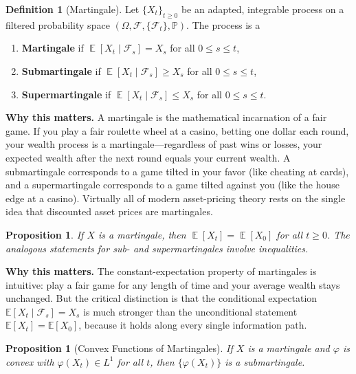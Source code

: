 \documentclass[11pt,a4paper,openany]{book}
\theoremstyle{definition}
\newtheorem{definition}{Definition}[chapter]
\theoremstyle{plain}
\newtheorem{proposition}[theorem]{Proposition}
\theoremstyle{remark}
\DeclareMathOperator{\E}{\mathbb{E}}
\newcommand{\1}{\mathbbm{1}}
\newcommand{\F}{\mathcal{F}}
\newcommand{\Pbb}{\mathbb{P}}
\begin{document}
\begin{definition}[Martingale]
Let $\{X_{t}\}_{t \geq 0}$ be an adapted, integrable process on a filtered probability space $(\Omega, \F, \{\F_{t}\}, \Pbb)$. The process is a
\begin{enumerate}[label=(\arabic*)]
    \item \textbf{Martingale} if $\E[X_{t} \mid \F_{s}] = X_{s}$ for all $0 \leq s \leq t$,
    \item \textbf{Submartingale} if $\E[X_{t} \mid \F_{s}] \geq X_{s}$ for all $0 \leq s \leq t$,
    \item \textbf{Supermartingale} if $\E[X_{t} \mid \F_{s}] \leq X_{s}$ for all $0 \leq s \leq t$.
\end{enumerate}
\end{definition}

\medskip
\noindent\textbf{Why this matters.} A martingale is the mathematical incarnation of a fair game. If you play a fair roulette wheel at a casino, betting one dollar each round, your wealth process is a martingale---regardless of past wins or losses, your expected wealth after the next round equals your current wealth. A submartingale corresponds to a game tilted in your favor (like cheating at cards), and a supermartingale corresponds to a game tilted against you (like the house edge at a casino). Virtually all of modern asset-pricing theory rests on the single idea that discounted asset prices are martingales.

\begin{proposition}
If $X$ is a martingale, then $\E[X_{t}] = \E[X_{0}]$ for all $t \geq 0$. The analogous statements for sub- and supermartingales involve inequalities.
\end{proposition}

\medskip
\noindent\textbf{Why this matters.} The constant-expectation property of martingales is intuitive: play a fair game for any length of time and your average wealth stays unchanged. But the critical distinction is that the conditional expectation $\mathbb{E}[X_t \mid \mathcal{F}_s] = X_s$ is much stronger than the unconditional statement $\mathbb{E}[X_t] = \mathbb{E}[X_0]$, because it holds along every single information path.

\begin{proposition}[Convex Functions of Martingales]
If $X$ is a martingale and $\varphi$ is convex with $\varphi(X_{t}) \in L^{1}$ for all $t$, then $\{\varphi(X_{t})\}$ is a submartingale.
\end{proposition}
\end{document}
